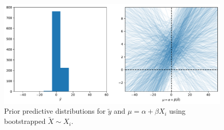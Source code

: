 \begin{figure}
    \centering
    \includegraphics[width=0.8\linewidth]{data/05_reporting/problem_set_2/prior_predictive.pdf}
    \caption{Prior predictive distributions for $\tilde{y}$ and $\mu = \alpha + \beta X_i$ using bootstrapped $\tilde{X} \sim X_i$.}
    \label{fig:prior-predictive}
\end{figure}